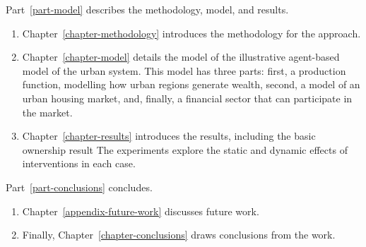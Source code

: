 \noindent Part~\ref{part-model} describes the methodology, model, and results.

\begin{enumerate}
    \item Chapter~\ref{chapter-methodology} introduces the methodology for the approach. 

    \item Chapter~\ref{chapter-model} details the model of the illustrative agent-based model of the urban system. This model has three  parts: first, a production function, modelling how urban regions generate wealth,  second, a model of an urban housing market, and, finally, a financial sector that can participate in the market. 


    \item Chapter~\ref{chapter-results} introduces the results, including the
    basic ownership result %
    The experiments explore the static and dynamic effects of interventions in each case. %
\end{enumerate}

\noindent Part~\ref{part-conclusions} %
concludes. 

\begin{enumerate}
    \item Chapter~\ref{appendix-future-work} discusses future work. 
    \item Finally, Chapter~\ref{chapter-conclusions} draws conclusions from the work.
\end{enumerate}



% 
